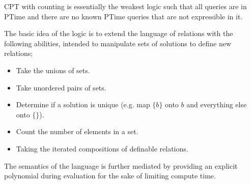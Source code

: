 CPT with counting is essentially the weakest logic such that all queries are in PTime and there are no known PTime queries that are not expressible in it.

The basic idea of the logic is to extend the language of relations with the following abilities, intended to manipulate sets of solutions to define new relations;

\begin{itemize}
\item Take the unions of sets.
\item Take unordered pairs of sets.
\item Determine if a solution is unique (e.g. map $\{b\}$ onto $b$ and everything else onto $\{\}$).
\item Count the number of elements in a set.
\item Taking the iterated compositions of definable relations.
\end{itemize}

The semantics of the language is further mediated by providing an explicit polynomial during evaluation for the sake of limiting compute time.




